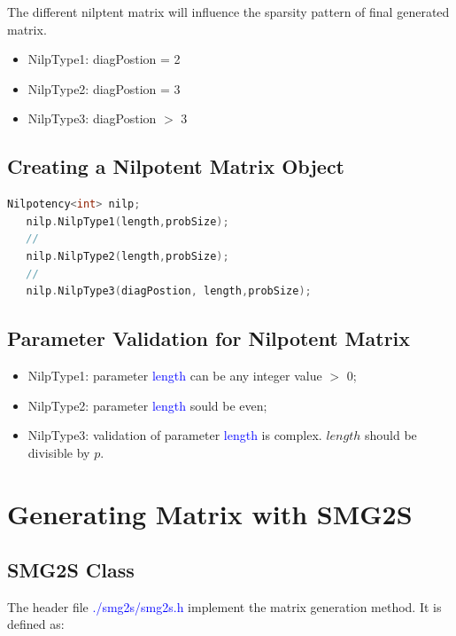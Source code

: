 \documentclass[a4paper, 10 pt]{report}
\begin{document}
The different nilptent matrix will influence the sparsity pattern of final generated matrix.

\begin{itemize}
	\item NilpType1: diagPostion = 2
	\item NilpType2: diagPostion = 3
	\item NilpType3: diagPostion $>$ 3
\end{itemize}


	\section{Creating a Nilpotent Matrix Object}
	
	\begin{lstlisting}[language=C++,frame=single]
   Nilpotency<int> nilp;
   nilp.NilpType1(length,probSize);
   //
   nilp.NilpType2(length,probSize);
   //
   nilp.NilpType3(diagPostion, length,probSize);
	\end{lstlisting}
	
	\section{Parameter Validation for Nilpotent Matrix}
	\begin{itemize}
	\item NilpType1: parameter \textcolor{blue}{length} can be any integer value $>$ 0;
	\item NilpType2: parameter \textcolor{blue}{length} sould be even;
	\item NilpType3: validation of parameter \textcolor{blue}{length} is complex. $length$ should be divisible by $p$.
\end{itemize}

	\newpage

	\chapter{Generating Matrix with SMG2S}
	
	\section{SMG2S Class}
	The header file \textcolor{blue}{./smg2s/smg2s.h} implement the matrix generation method. It is defined as:
	
\end{document}
